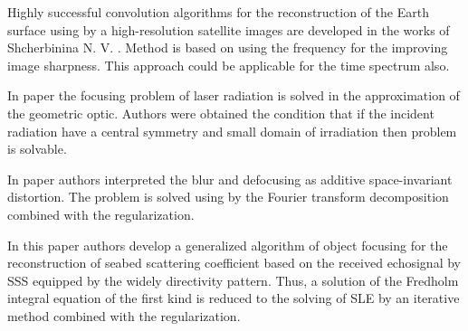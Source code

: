 \documentclass{procDDs}
\begin{document}
Highly successful convolution algorithms for the reconstruction of  the Earth surface  using by a high-resolution satellite images are developed in the works of Shcherbinina N. V. \cite{Shcherbinina}. Method is based on using the frequency for the improving image sharpness. This approach could be applicable for the time spectrum also.

In paper \cite{p2} the focusing problem of laser radiation is solved in the approximation of the geometric optic. Authors were obtained the condition that if the incident radiation have a central symmetry and small domain of irradiation then problem is solvable.

In paper \cite{p3} authors interpreted the blur and defocusing as additive space-invariant distortion. The problem is solved using by the Fourier transform decomposition combined with the regularization.

In this paper authors develop a generalized algorithm of object focusing for the reconstruction of seabed scattering coefficient based on the received echosignal by SSS equipped by the widely directivity pattern. Thus, a solution of the Fredholm integral equation of the first kind is reduced to the solving of SLE by an iterative method combined with the regularization.
\end{document}
